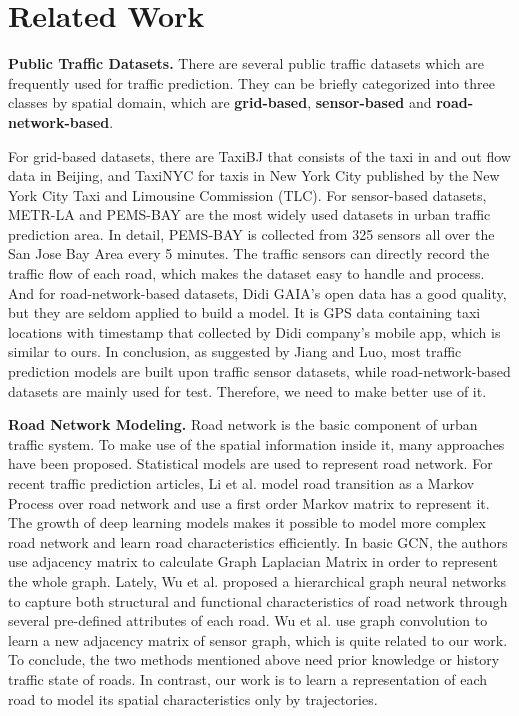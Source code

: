 
\section{Related Work}
\textbf{Public Traffic Datasets.} There are several public traffic datasets which are frequently used for traffic prediction. They can be briefly categorized into three classes by spatial domain, which are \textbf{grid-based}, \textbf{sensor-based} and \textbf{road-network-based}.

For grid-based datasets, there are TaxiBJ\cite{taxibj} that consists of the taxi in and out flow data in Beijing, and TaxiNYC for taxis in New York City published by the New York City Taxi and Limousine Commission (TLC). For sensor-based datasets, METR-LA\cite{DCRNN} and PEMS-BAY are the most widely used datasets in urban traffic prediction area. In detail, PEMS-BAY is collected from 325 sensors all over the San Jose Bay Area every 5 minutes. The traffic sensors can directly record the traffic flow of each road, which makes the dataset easy to handle and process. And for road-network-based datasets, Didi GAIA's open data has a good quality, but they are seldom applied to build a model. It is GPS data containing taxi locations with timestamp that collected by Didi company's mobile app, which is similar to ours. In conclusion, as suggested by Jiang and Luo\cite{surveyGNN}, most traffic prediction models are built upon traffic sensor datasets, while road-network-based datasets are mainly used for test. Therefore, we need to make better use of it.

\vspace{\baselineskip}

\textbf{Road Network Modeling.} Road network is the basic component of urban traffic system. To make use of the spatial information inside it, many approaches have been proposed. Statistical models are used to represent road network. For recent traffic prediction articles, Li et al.\cite{AAAI21} model road transition as a Markov Process over road network and use a first order Markov matrix to represent it. The growth of deep learning models makes it possible to model more complex road network and learn road characteristics efficiently. In basic GCN\cite{GCN0}, the authors use adjacency matrix to calculate Graph Laplacian Matrix in order to represent the whole graph. Lately, Wu et al.\cite{roadrep} proposed a hierarchical graph neural networks to capture both structural and functional characteristics of road network through several pre-defined attributes of each road. Wu et al.\cite{GWNET} use graph convolution to learn a new adjacency matrix of sensor graph, which is quite related to our work. To conclude, the two methods mentioned above need prior knowledge or history traffic state of roads. In contrast, our work is to learn a representation of each road to model its spatial characteristics only by trajectories.

